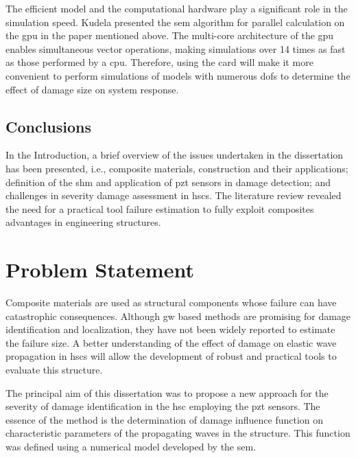 \documentclass[11pt,a4paper,final]{report}
\begin{document}
The efficient model and the computational hardware play a significant role in the simulation speed. 
Kudela presented the \ac{sem} algorithm for parallel calculation on the \ac{gpu} in the paper mentioned above.
The multi-core architecture of the \ac{gpu} enables simultaneous vector operations, making simulations over 14 times as fast as those performed by a \ac{cpu}.
Therefore, using the card will make it more convenient to perform simulations of models with numerous \acp{dof} to determine the effect of damage size on system response.
 \section{Conclusions}
\label{sec:conclusionsIntro}

In the Introduction, a brief overview of the issues undertaken in the dissertation has been presented,  i.e., composite materials, construction and their applications;  definition of the \ac{shm} and application of \ac{pzt} sensors in damage detection; and challenges in severity damage assessment in \acp{hsc}.
The literature review revealed the need for a practical tool failure estimation to fully exploit composites advantages in engineering structures. \clearpage{}
\clearpage{}



\chapter[Problem Statement]{Problem Statement}
\label{ch:problem}





Composite materials are used as structural components whose failure can have catastrophic consequences.
Although \ac{gw} based methods are promising for damage identification and localization, they have not been widely reported to estimate the failure size.
A better understanding of the effect of damage on elastic wave propagation in \acp{hsc} will allow the development of robust and practical tools to evaluate this structure.

The principal aim of this dissertation was to propose a new approach for the severity of damage identification in the \ac{hsc} employing the \ac{pzt} sensors.
The essence of the method is the determination of damage influence function on characteristic parameters of the propagating waves in the structure.
This function was defined using a numerical model developed by the \ac{sem}.
\end{document}
